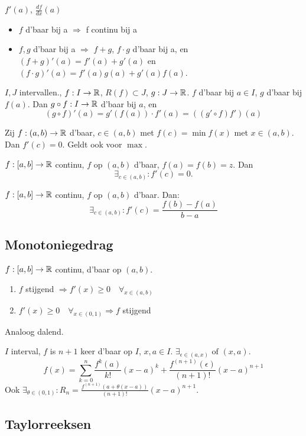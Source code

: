 \documentclass[week=1]{homework}
\begin{document}
	\Not $f'(a)$, $\frac{df}{dx}(a)$
	
	\begin{itemize}
		\item $f$ d'baar bij a $\Rightarrow$ f continu bij a
		\item $f,g$ d'baar bij a $\Rightarrow$ $f + g$, $f \cdot g$ d'baar bij a, en $(f+g)'(a) = f'(a) + g'(a)$ en $(f \cdot g)'(a) = f'(a) g(a) + g'(a)f(a)$. 
	\end{itemize}
	
	\Stel[Kettingregel] $I, J$ intervallen., $f : I \to \mathbb{R}$, $R(f) \subset J$, $g : J \to \mathbb{R}$. $f$ d'baar bij $a \in I$, $g$ d'baar bij $f(a)$. Dan $g \circ f : I \to \mathbb{R}$ d'baar bij $a$, en 
	\[
		(g \circ f)'(a) = g'(f(a)) \cdot f'(a) = ((g' \circ f) f') (a)
	\]
	
	\Stel Zij $f: (a,b) \to \mathbb{R}$ d'baar, $c \in (a,b)$ met $f(c) = \min f(x)$ met $x \in (a,b)$. Dan $f'(c) = 0.$ Geldt ook voor $\max$.
	
	\Stel[Rolle] $f:[a,b] \to \mathbb{R}$ continu, $f$ op $(a,b)$ d'baar, $f(a) = f(b) = z.$ Dan 
	\[
		\exists_{c \in (a,b)} : f'(c) = 0.
	\]
	
	\Stel[Middelwaardestelling] $f:[a,b] \to \mathbb{R}$ continu, $f$ op $(a,b)$ d'baar. Dan:
	\[
		\exists_{c \in (a,b)} : f'(c) = \frac{f(b) - f(a)}{b-a}
	\]
	\subsection*{Monotoniegedrag}
	
	\Stel $f : [a,b] \to \mathbb{R}$ continu, d'baar op $(a,b)$. 
	\begin{enumerate}
		\item $f$ stijgend $\Rightarrow f'(x) \ge 0 \quad \forall_{x \in (a,b)}$
		\item $f'(x) \ge 0 \quad \forall_{x \in (0,1)} \Rightarrow f$ stijgend 
	\end{enumerate}
	Analoog dalend.
	
	 $I$ interval, $f$ is $n+1$ keer d'baar op $I$, $x, a \in I$. $\exists_{\epsilon \in (a,x)} \text{ of } (x,a)$. 
	\[
		f(x) = \sum_{k=0}^{n} \frac{f^k(a)}{k!} (x-a)^k + \frac{f^{(n+1)}(\epsilon)}{(n+1)!} (x-a)^{n+1}
	\]
	Ook $\exists_{\theta \in (0,1)}: R_n = \frac{f^{(n+1)} (a + \theta(x-a))}{(n+1)!}(x-a)^{n+1}$. 	
	
	\subsection*{Taylorreeksen}
	
\end{document}
